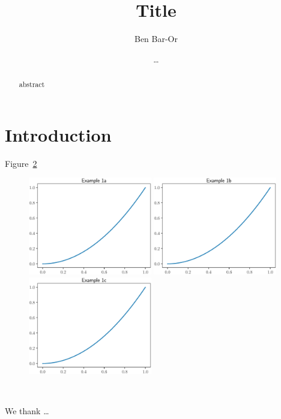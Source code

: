 \documentclass[times,twocolumn]{aastex62}
\begin{document}
\title{Title}

\author{Ben Bar-Or}

\author{\dots}


\begin{abstract}
  abstract
\end{abstract}


\section{Introduction}
Figure~\ref{fig:example}

\cite{Bar-Or+2016} 

\begin{figure}[h]
  \includegraphics[width=0.48\textwidth]{figures/example_1a}
  \includegraphics[width=0.48\textwidth]{figures/example_1b}
  \includegraphics[width=0.48\textwidth]{figures/example_1c}
\caption{\label{fig:example}}
\end{figure}

\begin{figure}[h]
\caption{\label{fig:example}}
\end{figure}



\acknowledgments\

We thank \dots





\end{document}
